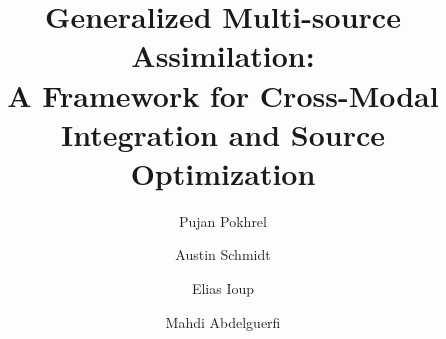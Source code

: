 \documentclass[preprint,12pt,authoryear]{elsarticle}
\begin{document}
\begin{frontmatter}

\title{Generalized Multi-source Assimilation:\\A Framework for Cross-Modal Integration and Source Optimization}

\author[uno]{Pujan Pokhrel}
\author[nrl]{Austin Schmidt}
\author[nrl]{Elias Ioup}
\author[uno]{Mahdi Abdelguerfi}

\address[uno]{GulfSCEI, University of New Orleans, New Orleans, United States}
\address[nrl]{Center for Geospatial Sciences, Naval Research Laboratory, Mississippi, United States}


\thispagestyle{empty} %

% 


\pagestyle{fancy}
\fancyhf{} %
\renewcommand{\headrulewidth}{0pt} %






\fancyfoot[CO,CE]{\footnotesize\thepage}

\fancypagestyle{plain}{%
  \fancyhf{} %
  \fancyfoot[CO,CE]{\footnotesize\thepage} %
  \renewcommand{\headrulewidth}{0pt} %
}



\end{frontmatter}
\end{document}

